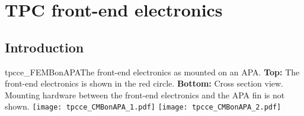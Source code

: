 





\section{TPC front-end electronics}
\label{ch:ce}

%
\subsection{Introduction}
\label{subsec:ce_intro}

\begin{cdrfigure}{tpcce_FEMBonAPA}{The 
front-end electronics as mounted on an APA.
  {\bf Top:} The front-end electronics is shown in the red circle.
  {\bf Bottom:} Cross section view. Mounting hardware between the front-end electronics 
and the APA fin is not shown.}
\texttt{[image: tpcce\_CMBonAPA\_1.pdf]}
\texttt{[image: tpcce\_CMBonAPA\_2.pdf]}
\end{cdrfigure}

